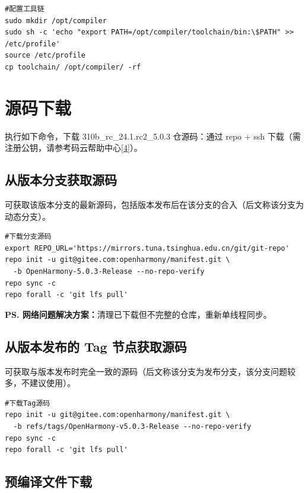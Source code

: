 \begin{lstlisting}[style=shell, caption={配置工具链}]
#配置工具链
sudo mkdir /opt/compiler
sudo sh -c 'echo "export PATH=/opt/compiler/toolchain/bin:\$PATH" >> /etc/profile'
source /etc/profile
cp toolchain/ /opt/compiler/ -rf
\end{lstlisting}


\section{源码下载}

执行如下命令，下载 310b\_rc\_24.1.rc2\_5.0.3 仓源码：通过 repo + ssh 下载（需注册公钥，请参考码云帮助中心\hyperref[ref:gitee-help]{[4]}）。

\subsection{从版本分支获取源码}

可获取该版本分支的最新源码，包括版本发布后在该分支的合入（后文称该分支为动态分支）。

\begin{lstlisting}[style=shell, caption={下载分支源码}]
#下载分支源码
export REPO_URL='https://mirrors.tuna.tsinghua.edu.cn/git/git-repo'
repo init -u git@gitee.com:openharmony/manifest.git \
  -b OpenHarmony-5.0.3-Release --no-repo-verify
repo sync -c
repo forall -c 'git lfs pull'
\end{lstlisting}

\noindent\textbf{PS. 网络问题解决方案：}清理已下载但不完整的仓库，重新单线程同步。

\subsection{从版本发布的 Tag 节点获取源码}

可获取与版本发布时完全一致的源码（后文称该分支为发布分支，该分支问题较多，不建议使用）。

\begin{lstlisting}[style=shell, caption={下载 Tag 源码}]
#下载Tag源码
repo init -u git@gitee.com:openharmony/manifest.git \
  -b refs/tags/OpenHarmony-v5.0.3-Release --no-repo-verify
repo sync -c
repo forall -c 'git lfs pull'
\end{lstlisting}

\subsection{预编译文件下载}

